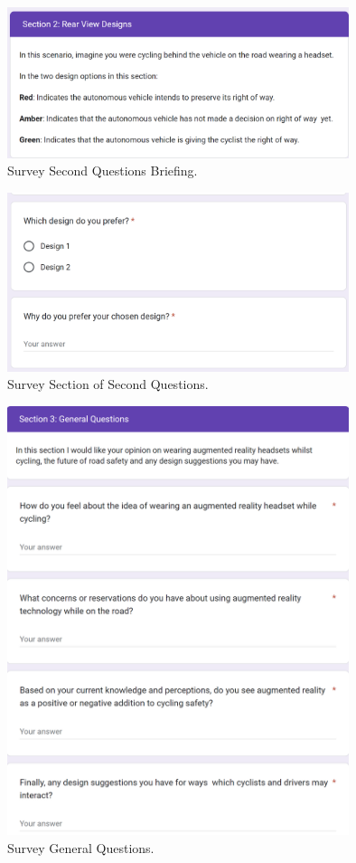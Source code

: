 \documentclass{l4proj}
\begin{document}
\begin{appendices}
\begin{figure}[H]
    \centering
    \includegraphics[width=10cm]{images/survey4.png}
    \caption{Survey Second Questions Briefing.}
    \label{fig:survey4}
\end{figure}

\begin{figure}[H]
    \centering
    \includegraphics[width=10cm]{images/survey5.png}
    \caption{Survey Section of Second Questions.}
    \label{fig:survey5}
\end{figure}

\begin{figure}[H]
    \centering
    \includegraphics[width=10cm]{images/survey6.png}
    \caption{Survey General Questions.}
    \label{fig:survey6}
\end{figure}

\end{appendices}
\end{document}
